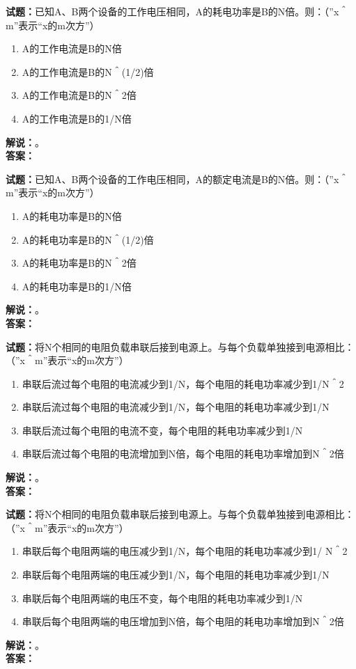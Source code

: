 \documentclass{ctexbook}
\begin{document}
\bigskip




\noindent\textbf{试题：}已知A、B两个设备的工作电压相同，A的耗电功率是B的N倍。则：（”x＾m”表示“x的m次方”）
\begin{enumerate}[leftmargin=3em]
\item A的工作电流是B的N倍
\item A的工作电流是B的N＾(1/2)倍
\item A的工作电流是B的N＾2倍
\item A的工作电流是B的1/N倍
\end{enumerate}
\noindent\textbf{解说：}\textbf{}。\\\noindent\textbf{答案：}

\bigskip




\noindent\textbf{试题：}已知A、B两个设备的工作电压相同，A的额定电流是B的N倍。则：（”x＾m”表示“x的m次方”）
\begin{enumerate}[leftmargin=3em]
\item A的耗电功率是B的N倍
\item A的耗电功率是B的N＾(1/2)倍
\item A的耗电功率是B的N＾2倍
\item A的耗电功率是B的1/N倍
\end{enumerate}
\noindent\textbf{解说：}\textbf{}。\\\noindent\textbf{答案：}

\bigskip




\noindent\textbf{试题：}将N个相同的电阻负载串联后接到电源上。与每个负载单独接到电源相比：（”x＾m”表示“x的m次方”）
\begin{enumerate}[leftmargin=3em]
\item 串联后流过每个电阻的电流减少到1/N，每个电阻的耗电功率减少到1/N＾2
\item 串联后流过每个电阻的电流减少到1/N，每个电阻的耗电功率减少到1/N
\item 串联后流过每个电阻的电流不变，每个电阻的耗电功率减少到1/N
\item 串联后流过每个电阻的电流增加到N倍，每个电阻的耗电功率增加到N＾2倍
\end{enumerate}
\noindent\textbf{解说：}\textbf{}。\\\noindent\textbf{答案：}

\bigskip




\noindent\textbf{试题：}将N个相同的电阻负载串联后接到电源上。与每个负载单独接到电源相比：（”x＾m”表示“x的m次方”）
\begin{enumerate}[leftmargin=3em]
\item 串联后每个电阻两端的电压减少到1/N，每个电阻的耗电功率减少到1/ N＾2
\item 串联后每个电阻两端的电压减少到1/N，每个电阻的耗电功率减少到1/N
\item 串联后每个电阻两端的电压不变，每个电阻的耗电功率减少到1/N
\item 串联后每个电阻两端的电压增加到N倍，每个电阻的耗电功率增加到N＾2倍
\end{enumerate}
\noindent\textbf{解说：}\textbf{}。\\\noindent\textbf{答案：}
\end{document}
